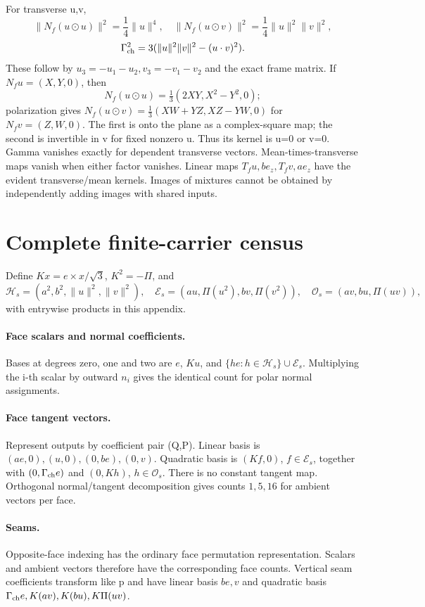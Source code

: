 For transverse u,v,
\[
\|N_f(u\odot u)\|^2=\frac14\|u\|^4,\quad
\|N_f(u\odot v)\|^2=\frac14\|u\|^2\|v\|^2,
\]
\[
\Gamma_{\rm ch}^2=3(\|u\|^2\|v\|^2-(u\cdot v)^2).
\]
These follow by \(u_3=-u_1-u_2,v_3=-v_1-v_2\) and the exact frame matrix. If \(N_fu=(X,Y,0)\), then
\[
N_f(u\odot u)=\tfrac13(2XY,X^2-Y^2,0);
\]
polarization gives \(N_f(u\odot v)=\tfrac13(XW+YZ,XZ-YW,0)\) for \(N_fv=(Z,W,0)\). The first is onto the plane as a complex-square map; the second is invertible in v for fixed nonzero u. Thus its kernel is u=0 or v=0. Gamma vanishes exactly for dependent transverse vectors. Mean-times-transverse maps vanish when either factor vanishes. Linear maps \(T_fu,be_z,T_fv,ae_z\) have the evident transverse/mean kernels. Images of mixtures cannot be obtained by independently adding images with shared inputs.

\section{Complete finite-carrier census}\label{app:census}
Define \(Kx=e\times x/\sqrt3\), \(K^2=-\Pi\), and
\[
\mathcal H_s=(a^2,b^2,\|u\|^2,\|v\|^2),\quad
\mathcal E_s=(au,\Pi(u^2),bv,\Pi(v^2)),\quad
\mathcal O_s=(av,bu,\Pi(uv)),
\]
with entrywise products in this appendix.

\paragraph{Face scalars and normal coefficients.}
Bases at degrees zero, one and two are \(e\), \(Ku\), and
\(\{he:h\in\mathcal H_s\}\cup\mathcal E_s\). Multiplying the i-th scalar by outward \(n_i\) gives the identical count for polar normal assignments.

\paragraph{Face tangent vectors.}
Represent outputs by coefficient pair (Q,P). Linear basis is
\((ae,0),(u,0),(0,be),(0,v)\). Quadratic basis is
\((Kf,0)\), \(f\in\mathcal E_s\), together with
\((0,\Gamma_{\rm ch}e)\) and \((0,Kh)\), \(h\in\mathcal O_s\).
There is no constant tangent map. Orthogonal normal/tangent decomposition gives counts \(1,5,16\) for ambient vectors per face.

\paragraph{Seams.}
Opposite-face indexing has the ordinary face permutation representation. Scalars and ambient vectors therefore have the corresponding face counts. Vertical seam coefficients transform like p and have linear basis \(be,v\) and quadratic basis
\(\Gamma_{\rm ch}e,K(av),K(bu),K\Pi(uv)\).

